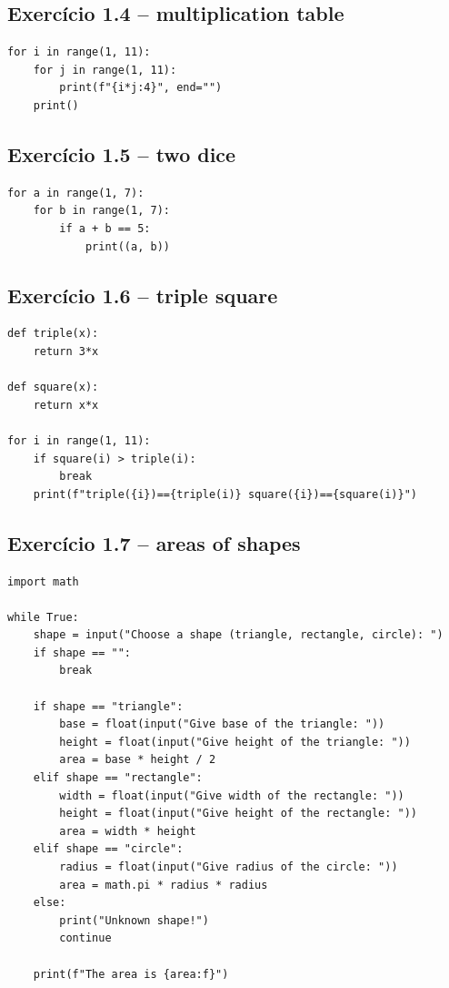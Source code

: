 \documentclass[11pt,a4paper]{article}
\begin{document}
\subsection*{Exercício 1.4 -- multiplication table}
\begin{solucao}
\begin{lstlisting}
for i in range(1, 11):
    for j in range(1, 11):
        print(f"{i*j:4}", end="")
    print()
\end{lstlisting}
\end{solucao}

\subsection*{Exercício 1.5 -- two dice}
\begin{solucao}
\begin{lstlisting}
for a in range(1, 7):
    for b in range(1, 7):
        if a + b == 5:
            print((a, b))
\end{lstlisting}
\end{solucao}

\subsection*{Exercício 1.6 -- triple square}
\begin{solucao}
\begin{lstlisting}
def triple(x):
    return 3*x

def square(x):
    return x*x

for i in range(1, 11):
    if square(i) > triple(i):
        break
    print(f"triple({i})=={triple(i)} square({i})=={square(i)}")
\end{lstlisting}
\end{solucao}

\subsection*{Exercício 1.7 -- areas of shapes}
\begin{solucao}
\begin{lstlisting}
import math

while True:
    shape = input("Choose a shape (triangle, rectangle, circle): ")
    if shape == "":
        break

    if shape == "triangle":
        base = float(input("Give base of the triangle: "))
        height = float(input("Give height of the triangle: "))
        area = base * height / 2
    elif shape == "rectangle":
        width = float(input("Give width of the rectangle: "))
        height = float(input("Give height of the rectangle: "))
        area = width * height
    elif shape == "circle":
        radius = float(input("Give radius of the circle: "))
        area = math.pi * radius * radius
    else:
        print("Unknown shape!")
        continue

    print(f"The area is {area:f}")
\end{lstlisting}
\end{solucao}
\end{document}
